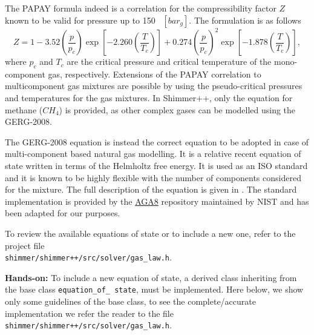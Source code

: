 The PAPAY formula \cite{Papay1968} indeed is a correlation for the compressibility factor $Z$ known to be valid for pressure up to 150~ $[bar_g]$. The formulation is as follows
\begin{equation*}
Z = 1 - 3.52 \left( \frac{p}{p_c} \right) \exp\left[-2.260 \left( \frac{T}{T_c} \right)\right] + 0.274 \left( \frac{p}{p_c} \right)^2 \exp\left[-1.878 \left( \frac{T}{T_c} \right)\right],
\end{equation*}
where $p_c$ and $T_c$ are the critical pressure and critical temperature of the mono-component gas, respectively. Extensions of the PAPAY correlation to multicomponent gas mixtures are possible by using the pseudo-critical pressures and temperatures for the gas mixtures. In Shimmer++, only the equation for methane ($CH_4$) is provided, as other complex gases can be modelled using the GERG-2008. 

The GERG-2008 equation is instead the correct equation to be adopted in case of multi-component based natural gas modelling. It is a relative recent equation of state written in terms of the Helmholtz free energy. It is used as an ISO standard and it is known to be highly flexible with the number of components considered for the mixture. The full description of the equation is given in \cite{GERG}.
The standard implementation is provided by the \href{https://github.com/usnistgov/AGA8}{AGA8} repository maintained by NIST and has been adapted for our purposes.

To review the available equations of state or to include a new one, refer to the project file \\
\texttt{shimmer/shimmer++/src/solver/gas\_law.h}.

\textbf{Hands-on:}
To include a new equation of state, a derived class inheriting from the base class \texttt{equation\_of\_ state}, must be implemented. Here below, we show only some guidelines of the base class, to see the complete/accurate implementation we refer the reader to the file \texttt{shimmer/shimmer++/src/solver/gas\_law.h}.
  
